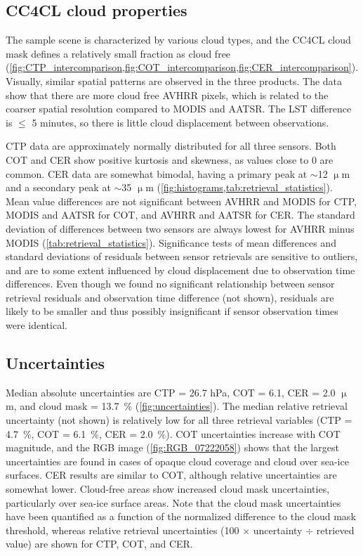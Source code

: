 \subsection{CC4CL cloud properties}

The sample scene is characterized by various cloud types, and the CC4CL cloud mask defines a relatively small fraction as cloud free (\cref{fig:CTP_intercomparison,fig:COT_intercomparison,fig:CER_intercomparison}). Visually, similar spatial patterns are observed in the three products. The data show that there are more cloud free AVHRR pixels, which is related to the coarser spatial resolution compared to MODIS and AATSR. The LST difference is $\le$ 5 minutes, so there is little cloud displacement between observations.

CTP data are approximately normally distributed for all three sensors. Both COT and CER show positive kurtosis and skewness, as values close to 0 are common. CER data are somewhat bimodal, having a primary peak at $\sim$12 $\upmu$m and a secondary peak at $\sim$35 $\upmu$m (\cref{fig:histograms,tab:retrieval_statistics}). Mean value differences are not significant between AVHRR and MODIS for CTP, MODIS and AATSR for COT, and AVHRR and AATSR for CER. The standard deviation of differences between two sensors are always lowest for AVHRR minus MODIS (\cref{tab:retrieval_statistics}). Significance tests of mean differences and standard deviations of residuals between sensor retrievals are sensitive to outliers, and are to some extent influenced by cloud displacement due to observation time differences. Even though we found no significant relationship between sensor retrieval residuals and observation time difference (not shown), residuals are likely to be smaller and thus possibly insignificant if sensor observation times were identical.

\subsection{Uncertainties}

Median absolute uncertainties are CTP = 26.7 hPa, COT = 6.1, CER = 2.0 $\upmu$m, and cloud mask = 13.7~\% (\cref{fig:uncertainties}). The median relative retrieval uncertainty (not shown) is relatively low for all three retrieval variables (CTP = 4.7~\%, COT = 6.1~\%, CER = 2.0~\%). COT uncertainties increase with COT magnitude, and the RGB image (\cref{fig:RGB_07222058}) shows that the largest uncertainties are found in cases of opaque cloud coverage and cloud over sea-ice surfaces. CER results are similar to COT, although relative uncertainties are somewhat lower. Cloud-free areas show increased cloud mask uncertainties, particularly over sea-ice surface areas. Note that the cloud mask uncertainties have been quantified as a function of the normalized difference to the cloud mask threshold, whereas relative retrieval uncertainties (100 $\times$ uncertainty $\div$ retrieved value) are shown for CTP, COT, and CER. 

